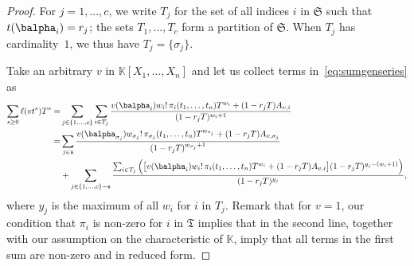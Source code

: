 \documentclass[12pt]{article}
\def\K {\ensuremath{\mathbb{K}}}
\begin{document}
\begin{proof}
For $j=1,\dots,c$, we write $T_j$ for the set of all indices $i$ in
$\mathfrak{S}$ such that $t(\balpha_{i})=r_j$; the sets
$T_1,\dots,T_c$ form a partition of $\mathfrak{S}$. When $T_j$ has
cardinality~$1$, we thus have $T_j=\{\sigma_j\}$.

Take an arbitrary $v$ in $\K[X_1,\dots,X_n]$ and let us
collect terms in~\eqref{eq:sumgenseries} as
\begin{align*}
  \sum_{s \ge 0} \ell(v t^s)T^s =&
  \sum_{j \in \{1,\dots,c\}}
  \sum_{i \in T_j} \frac{
v(\balpha_{i})   w_{i}!\, \pi_{i}(t_1,\dots,t_n)
    T^{w_{i}} + (1-r_{j}  T)A_{v,i}}
      {(1-r_{j} T)^{w_{i}+1}}\\
 =&
  \sum_{j \in \mathfrak{s}}
\frac{
v(\balpha_{\sigma_{j}})  w_{\sigma_j}!\, \pi_{\sigma_j}(t_1,\dots,t_n)
    T^{w_{\sigma_j}} + (1-r_{j}  T)A_{v,\sigma_j} }
      {(1-r_{j} T)^{w_{\sigma_j}+1}}\\
&+
  \sum_{j \in \{1,\dots,c\}-\mathfrak{s}}
 \frac{   \sum_{i \in T_j} \Big( \big[
v(\balpha_{i})   w_{i}!\, \pi_{i}(t_1,\dots,t_n)
    T^{w_{i}} + (1-r_{j}  T)A_{v,i} \big ]
(1-r_{j} T)^{y_j-(w_i+1)}\Big)}
      {(1-r_{j} T)^{y_j}},
\end{align*}
where $y_j$ is the maximum of all $w_i$ for $i$ in $T_j$.  Remark that
for $v=1$, our condition that $\pi_i$ is non-zero for $i$ in
$\mathfrak{T}$ implies that in the second line, together with our
assumption on the characteristic of $\K$, imply that all terms in the
first sum are non-zero and in reduced form.  


\end{proof}
\end{document}
